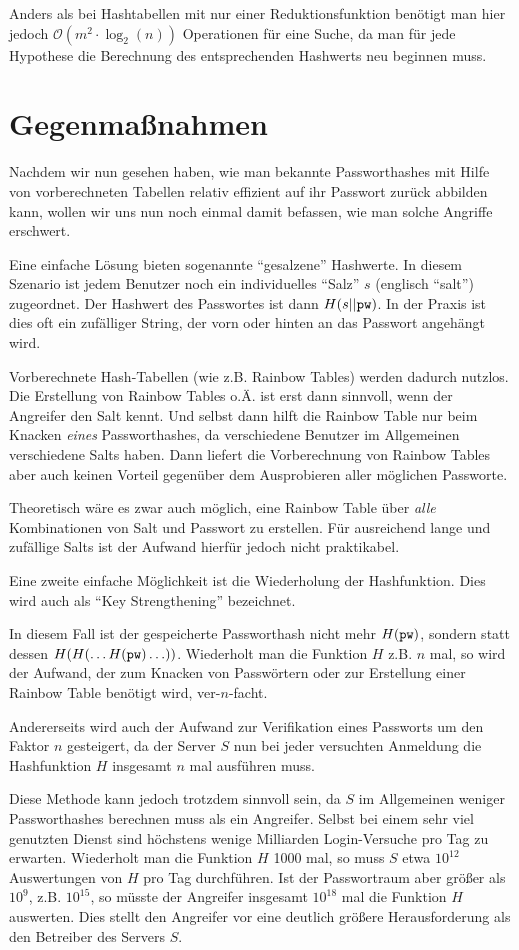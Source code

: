 Anders als bei Hashtabellen mit nur einer Reduktionsfunktion benötigt
man hier jedoch $\mathcal{O}(m^2 \cdot \log_2(n))$ Operationen für eine
Suche, da man für jede Hypothese die Berechnung des entsprechenden
Hashwerts neu beginnen muss.

\section{Gegenmaßnahmen}


Nachdem wir nun gesehen haben, wie man bekannte Passworthashes mit Hilfe
von vorberechneten Tabellen relativ effizient auf ihr Passwort zurück
abbilden kann, wollen wir uns nun noch einmal damit befassen, wie man
solche Angriffe erschwert.

Eine einfache Lösung bieten sogenannte "`gesalzene"' Hashwerte. In
diesem Szenario ist jedem Benutzer noch ein individuelles "`Salz"' $s$
(englisch "`salt"') zugeordnet. Der Hashwert des Passwortes ist dann
$H(s || \texttt{pw})$. In der Praxis ist dies oft ein zufälliger String, der vorn
oder hinten an das Passwort angehängt wird.

Vorberechnete Hash-Tabellen (wie z.B. Rainbow Tables)
werden dadurch nutzlos. Die Erstellung von Rainbow Tables o.Ä. ist erst
dann sinnvoll, wenn der Angreifer den Salt kennt. Und selbst dann hilft
die Rainbow Table nur beim Knacken \emph{eines} Passworthashes, da
verschiedene Benutzer im Allgemeinen verschiedene Salts haben. Dann
liefert die Vorberechnung von Rainbow Tables aber auch keinen Vorteil
gegenüber dem Ausprobieren aller möglichen Passworte.


Theoretisch wäre es zwar auch möglich, eine Rainbow Table über
\emph{alle} Kombinationen von Salt und Passwort zu erstellen. Für
ausreichend lange und zufällige Salts ist der Aufwand hierfür jedoch
nicht praktikabel.

Eine zweite einfache Möglichkeit ist die Wiederholung der
Hashfunktion. Dies wird auch als "`Key Strengthening"' bezeichnet.

In diesem Fall ist der gespeicherte Passworthash nicht mehr $H(\texttt{pw})$,
sondern statt dessen $H(H(\ldots H(\texttt{pw})\ldots))$. Wiederholt man die Funktion $H$
z.B. $n$ mal, so wird der Aufwand, der zum Knacken von Passwörtern oder
zur Erstellung einer Rainbow Table benötigt wird, ver-$n$-facht.

Andererseits wird auch der Aufwand zur Verifikation eines Passworts um
den Faktor $n$ gesteigert, da der Server $S$ nun bei jeder versuchten
Anmeldung die Hashfunktion $H$ insgesamt $n$ mal ausführen muss.

Diese Methode kann jedoch trotzdem sinnvoll sein, da $S$ im Allgemeinen
weniger Passworthashes berechnen muss als ein Angreifer. Selbst bei
einem sehr viel genutzten Dienst sind höchstens wenige Milliarden
Login-Versuche pro Tag zu erwarten. Wiederholt man die Funktion $H$ 1000
mal, so muss $S$ etwa $10^{12}$ Auswertungen von $H$ pro Tag
durchführen. Ist der Passwortraum aber größer als $10^9$,
z.B. $10^{15}$, so müsste der Angreifer insgesamt $10^{18}$ mal die
Funktion $H$ auswerten. Dies stellt den Angreifer vor eine deutlich
größere Herausforderung als den Betreiber des Servers $S$.

